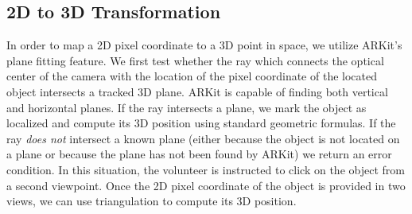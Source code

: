 \documentclass[chi_draft]{sigchi}
\begin{document}
\subsection{2D to 3D Transformation}
In order to map a 2D pixel coordinate to a 3D point in space, we utilize ARKit's plane fitting feature.  We first test whether the ray which connects the optical center of the camera with the location of the pixel coordinate of the located object intersects a tracked 3D plane.  ARKit is capable of finding both vertical and horizontal planes.  If the ray intersects a plane, we mark the object as localized and compute its 3D position using standard geometric formulas.  If the ray \emph{does not} intersect a known plane (either because the object is not located on a plane or because the plane has not been found by ARKit) we return an error condition.  In this situation, the volunteer is instructed to click on the object from a second viewpoint.  Once the 2D pixel coordinate of the object is provided in two views, we can use triangulation to compute its 3D position. %
%
%

%
\end{document}
